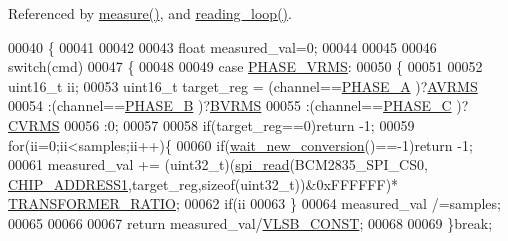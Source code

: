 Referenced by \hyperlink{a00042_source_l00040}{measure()}, and \hyperlink{a00035_source_l00302}{reading\-\_\-loop()}.


\begin{DoxyCode}
00040                                                         \{
00041 
00042 
00043     \textcolor{keywordtype}{float} measured\_val=0;
00044 
00045 
00046          \textcolor{keywordflow}{switch}(cmd)
00047         \{
00048            
00049                 \textcolor{keywordflow}{case}  \hyperlink{a00043_af0c09c5a455410e6fbd35fd55221338f}{PHASE\_VRMS}:
00050                 \{
00051                                 
00052                     uint16\_t ii;
00053                     uint16\_t target\_reg =  (channel==\hyperlink{a00043_ad214039f52b011ce2bd6c85ff98a981b}{PHASE\_A} )?\hyperlink{a00036_ae4c7fedd5702010e6907a686a35c1fa8}{AVRMS}
00054                                           :(channel==\hyperlink{a00043_ad7b96feed1e1c12515dad5e926b2c62e}{PHASE\_B} )?\hyperlink{a00036_a09f7027a92ccae6bb9b5738d5bc185f3}{BVRMS}
00055                                           :(channel==\hyperlink{a00043_a3ceb83fb10c2af19b468d508448f24e2}{PHASE\_C} )?\hyperlink{a00036_a61e9291ce0829a45cee1ee9a5f3ea4f7}{CVRMS}
00056                                           :0;                               
00057                     
00058                     \textcolor{keywordflow}{if}(target\_reg==0)\textcolor{keywordflow}{return} -1;                         
00059                     \textcolor{keywordflow}{for}(ii=0;ii<samples;ii++)\{
00060                     \textcolor{keywordflow}{if}(\hyperlink{a00003_ga7b6d584350762c53419945480d6958d3}{wait\_new\_conversion}()==-1)\textcolor{keywordflow}{return} -1;
00061                     measured\_val += (uint32\_t)(\hyperlink{a00007_ga7ad9f65ee46aca507374096506a0b1c4}{spi\_read}(BCM2835\_SPI\_CS0,
      \hyperlink{a00037_a94de2b046db6e10257ef4481c0a15eaa}{CHIP\_ADDRESS1},target\_reg,\textcolor{keyword}{sizeof}(uint32\_t))&0xFFFFFF)*
      \hyperlink{a00037_abcedc82a86b3c2ac9850cb7c6f5e7a9b}{TRANSFORMER\_RATIO}; 
00062                     \textcolor{keywordflow}{if}(ii%
00063                     \}
00064                     measured\_val /=samples;
00065                     
00066             
00067                     \textcolor{keywordflow}{return} measured\_val/\hyperlink{a00037_aef67453964ff5f4b43fa56b18cee9925}{VLSB\_CONST};
00068                 
00069                 \}\textcolor{keywordflow}{break};

\end{DoxyCode}
